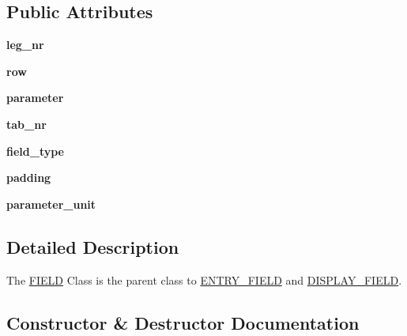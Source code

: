 \subsection*{Public Attributes}
\begin{DoxyCompactItemize}
\item 
\mbox{\label{classfield_1_1FIELD_a58ba464aba1e6a9f0083a7219e7c2fe7}} 
{\bfseries leg\+\_\+nr}
\item 
\mbox{\label{classfield_1_1FIELD_a50ac2059ce466caa6e0e8e52c580d7e4}} 
{\bfseries row}
\item 
\mbox{\label{classfield_1_1FIELD_ab03ad187f5b2ee1d408871e729d5c233}} 
{\bfseries parameter}
\item 
\mbox{\label{classfield_1_1FIELD_a7423afa050f15e240e70a692ba93e0cb}} 
{\bfseries tab\+\_\+nr}
\item 
\mbox{\label{classfield_1_1FIELD_a58a640d2782045a98b18d531e633f0ab}} 
{\bfseries field\+\_\+type}
\item 
\mbox{\label{classfield_1_1FIELD_a140080174fbd572c0ec9ef0379265875}} 
{\bfseries padding}
\item 
\mbox{\label{classfield_1_1FIELD_a0cf194239d7c5a8acf89c2a53dcdf0e7}} 
{\bfseries parameter\+\_\+unit}
\end{DoxyCompactItemize}


\subsection{Detailed Description}
The \hyperlink{classfield_1_1FIELD}{F\+I\+E\+LD} Class is the parent class to \hyperlink{classfield_1_1ENTRY__FIELD}{E\+N\+T\+R\+Y\+\_\+\+F\+I\+E\+LD} and \hyperlink{classfield_1_1DISPLAY__FIELD}{D\+I\+S\+P\+L\+A\+Y\+\_\+\+F\+I\+E\+LD}. 



\subsection{Constructor \& Destructor Documentation}
\mbox{\label{classfield_1_1FIELD_ab7abb063e678d80e62141febc7e1016c}} 
